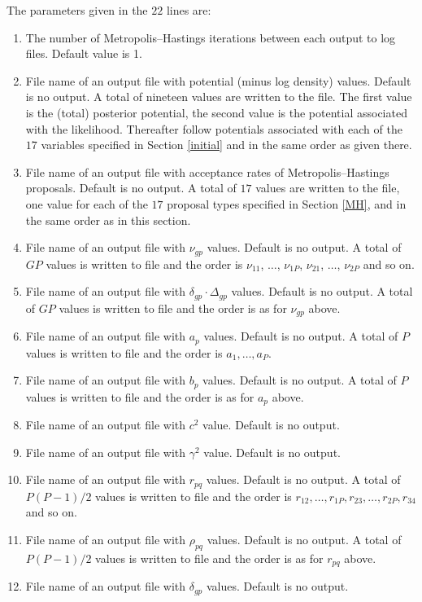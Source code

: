 \documentclass[11pt]{article}
\begin{document}
The parameters given in the $22$ lines are:
\begin{enumerate}
\item The number of Metropolis--Hastings iterations between each output to log files. Default
value is 1.
\item File name of an output file with potential (minus log density) values. Default is no 
output. A total of nineteen values are written to the file. The first value is the (total) posterior 
potential, the second value is the potential associated with the likelihood. Thereafter follow
potentials associated with each of the $17$ variables specified in Section \ref{initial} and in 
the same order as given there.
\item File name of an output file with acceptance rates of Metropolis--Hastings proposals. Default
is no output. A total of $17$ values are written to the file, one value for each of 
the $17$ proposal types specified in Section \ref{MH}, and in the same order as in this
section.
\item File name of an output file with $\nu_{gp}$ values. Default is no output.
A total of $GP$ values is written to file and the order is $\nu_{11}$,
$\ldots$, $\nu_{1P}$, $\nu_{21}$, $\ldots$, $\nu_{2P}$ and so on.
\item File name of an output file with $\delta_{gp}\cdot \Delta_{gp}$ values. Default is no output.
A total of $GP$ values is written to file and the order is as for $\nu_{gp}$ above.
\item File name of an output file with $a_p$ values. Default is no output.
A total of $P$ values is written to file and the order is $a_1,\ldots,a_P$.
\item File name of an output file with $b_p$ values. Default is no output.
A total of $P$ values is written to file and the order is as for $a_p$ above.
\item File name of an output file with $c^2$ value. Default is no output.
\item File name of an output file with $\gamma^2$ value. Default is no output.
\item File name of an output file with $r_{pq}$ values. Default is no output.
A total of $P(P-1)/2$ values is written to file and the order is $r_{12},\ldots,
r_{1P},r_{23},\ldots,r_{2P},r_{34}$ and so on.
\item File name of an output file with $\rho_{pq}$ values. Default is no output.
A total of $P(P-1)/2$ values is written to file and the order is as for $r_{pq}$ above.
\item File name of an output file with $\delta_{gp}$ values. Default is no output.

\end{enumerate}
\end{document}
